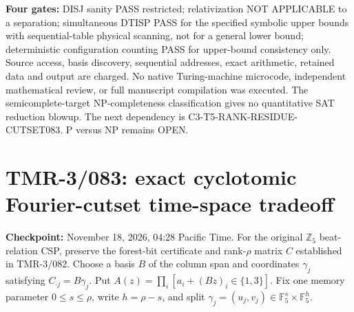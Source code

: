 \documentclass[11pt]{article}
\begin{document}
\noindent\textbf{Four gates:} DISJ sanity PASS restricted;
relativization NOT APPLICABLE to a separation;
simultaneous DTISP PASS for the specified symbolic upper bounds
with sequential-table physical scanning, not for a general lower
bound; deterministic configuration counting PASS for
upper-bound consistency only. Source access, basis discovery,
sequential addresses, exact arithmetic, retained data and output
are charged. No native Turing-machine microcode, independent
mathematical review, or full manuscript compilation was executed.
The semicomplete-target NP-completeness classification
\cite{BangJensenHellMacGillivray1988} gives no quantitative
SAT reduction blowup. The next dependency is
\textsc{C3-T5-RANK-RESIDUE-CUTSET083}.
P versus NP remains OPEN.

\section{TMR-3/083: exact cyclotomic Fourier-cutset time-space tradeoff}

\noindent\textbf{Checkpoint:} November 18, 2026, 04:28 Pacific Time.
For the original $\mathbb Z_5$ beat-relation CSP, preserve the
forest-bit certificate and rank-$\rho$ matrix $C$ established in
TMR-3/082. Choose a basis $B$ of the column span and coordinates
$\gamma_j$ satisfying $C_{\cdot j}=B\gamma_j$. Put
$A(z)=\prod_i[a_i+(Bz)_i\in\{1,3\}]$. Fix one memory parameter
$0\leq s\leq\rho$, write $h=\rho-s$, and split
$\gamma_j=(u_j,v_j)\in\mathbb F_5^s\times\mathbb F_5^h$.
\end{document}
